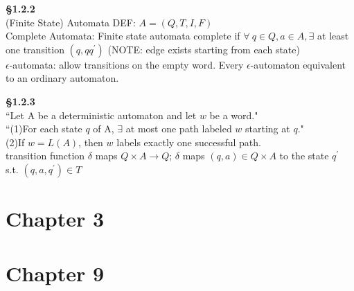 \documentclass[12pt]{article}
\begin{document}
\newpage %

\textbf{\S{1.2.2}}\\
(Finite State) Automata DEF: $A = (Q, T, I,F)$\\

Complete Automata: Finite state automata complete if $\forall \ q \in Q, a \in A, \exists$ at least one transition $(q, q q^{'})$ (NOTE: edge exists starting from each state)\\
$\epsilon$-automata: allow transitions on the empty word. Every $\epsilon$-automaton equivalent to an ordinary automaton.

\textbf{\S{1.2.3}}\\
``Let A be a deterministic automaton and let $w$ be a word."\\
``(1)For each state $q$ of A, $\exists$ at most one path labeled $w$ starting at $q$."\\
(2)If $w = L(A)$, then $w$ labels exactly one successful path.\\
transition function $\delta$ maps $Q \times A \to Q$; $\delta$ maps $(q, a) \in Q \times A$ to the state $q^{'}$ s.t. $(q,a,q^{'}) \in T$
\section{Chapter 3}

\section{Chapter 9}
\end{document}
